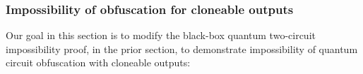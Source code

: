 \documentclass[11pt]{article}
\numberwithin{equation}{section}
\begin{document}
{%
%

\subsubsection{Impossibility of obfuscation for cloneable outputs}

Our goal in this section is to modify the black-box quantum two-circuit impossibility proof, in the prior section, to demonstrate impossibility of quantum circuit obfuscation with cloneable outputs:

}
\end{document}
